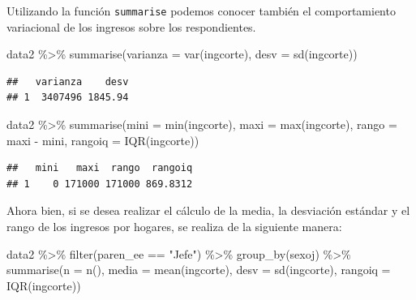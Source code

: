 \documentclass[
  12pt,
]{book}
\newenvironment{Shaded}{\begin{snugshade}}{\end{snugshade}}
\newcommand{\AttributeTok}[1]{\textcolor[rgb]{0.77,0.63,0.00}{#1}}
\newcommand{\FunctionTok}[1]{\textcolor[rgb]{0.00,0.00,0.00}{#1}}
\newcommand{\NormalTok}[1]{#1}
\newcommand{\SpecialCharTok}[1]{\textcolor[rgb]{0.00,0.00,0.00}{#1}}
\newcommand{\StringTok}[1]{\textcolor[rgb]{0.31,0.60,0.02}{#1}}
\begin{document}
Utilizando la función \texttt{summarise} podemos conocer también el comportamiento variacional de los ingresos sobre los respondientes.

\begin{Shaded}
\begin{Highlighting}[]
\NormalTok{data2 }\SpecialCharTok{\%\textgreater{}\%} \FunctionTok{summarise}\NormalTok{(}\AttributeTok{varianza =} \FunctionTok{var}\NormalTok{(ingcorte),}
                    \AttributeTok{desv =} \FunctionTok{sd}\NormalTok{(ingcorte))}
\end{Highlighting}
\end{Shaded}

\begin{verbatim}
##   varianza    desv
## 1  3407496 1845.94
\end{verbatim}

\begin{Shaded}
\begin{Highlighting}[]
\NormalTok{data2 }\SpecialCharTok{\%\textgreater{}\%} \FunctionTok{summarise}\NormalTok{(}\AttributeTok{mini =} \FunctionTok{min}\NormalTok{(ingcorte),}
                    \AttributeTok{maxi =} \FunctionTok{max}\NormalTok{(ingcorte),}
                    \AttributeTok{rango =}\NormalTok{ maxi }\SpecialCharTok{{-}}\NormalTok{ mini,}
                    \AttributeTok{rangoiq =} \FunctionTok{IQR}\NormalTok{(ingcorte))}
\end{Highlighting}
\end{Shaded}

\begin{verbatim}
##   mini   maxi  rango  rangoiq
## 1    0 171000 171000 869.8312
\end{verbatim}

Ahora bien, si se desea realizar el cálculo de la media, la desviación estándar y el rango de los ingresos por hogares, se realiza de la siguiente manera:

\begin{Shaded}
\begin{Highlighting}[]
\NormalTok{data2 }\SpecialCharTok{\%\textgreater{}\%} \FunctionTok{filter}\NormalTok{(paren\_ee }\SpecialCharTok{==} \StringTok{"Jefe"}\NormalTok{) }\SpecialCharTok{\%\textgreater{}\%}
  \FunctionTok{group\_by}\NormalTok{(sexoj) }\SpecialCharTok{\%\textgreater{}\%}
  \FunctionTok{summarise}\NormalTok{(}\AttributeTok{n =} \FunctionTok{n}\NormalTok{(),}
            \AttributeTok{media =} \FunctionTok{mean}\NormalTok{(ingcorte),}
            \AttributeTok{desv =} \FunctionTok{sd}\NormalTok{(ingcorte),}
            \AttributeTok{rangoiq =} \FunctionTok{IQR}\NormalTok{(ingcorte))}
\end{Highlighting}
\end{Shaded}
\end{document}
